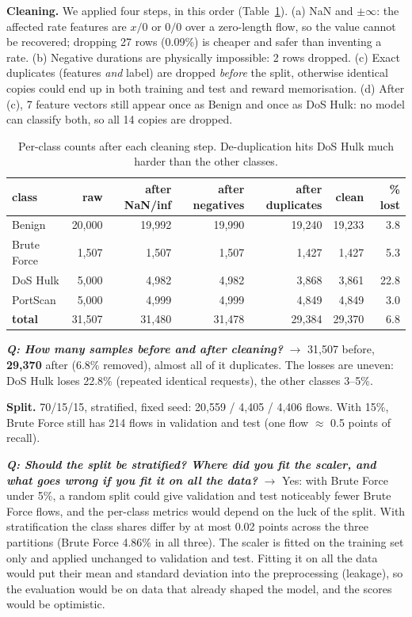 \documentclass[9pt]{extarticle}
\newcommand{\Q}[1]{\textbf{\emph{Q: #1}}}
\begin{document}
\textbf{Cleaning.} We applied four steps, in this order (Table~\ref{tab:clean}). (a) NaN and $\pm\infty$: the affected rate features are $x/0$ or $0/0$ over a zero-length flow, so the value cannot be recovered; dropping 27 rows (0.09\%) is cheaper and safer than inventing a rate. (b) Negative durations are physically impossible: 2 rows dropped. (c) Exact duplicates (features \emph{and} label) are dropped \emph{before} the split, otherwise identical copies could end up in both training and test and reward memorisation. (d) After (c), 7 feature vectors still appear once as Benign and once as DoS Hulk: no model can classify both, so all 14 copies are dropped.

\begin{table}[h]
\centering\small
\begin{tabular}{lrrrrrr}
\toprule
class & raw & after NaN/inf & after negatives & after duplicates & clean & \% lost \\
\midrule
Benign & 20,000 & 19,992 & 19,990 & 19,240 & 19,233 & 3.8 \\
Brute Force & 1,507 & 1,507 & 1,507 & 1,427 & 1,427 & 5.3 \\
DoS Hulk & 5,000 & 4,982 & 4,982 & 3,868 & 3,861 & 22.8 \\
PortScan & 5,000 & 4,999 & 4,999 & 4,849 & 4,849 & 3.0 \\
\textbf{total} & 31,507 & 31,480 & 31,478 & 29,384 & 29,370 & 6.8 \\
\bottomrule
\end{tabular}
\caption{Per-class counts after each cleaning step. De-duplication hits DoS Hulk much harder than the other classes.}
\label{tab:clean}
\end{table}

\Q{How many samples before and after cleaning?} $\rightarrow$ 31,507 before, \textbf{29,370} after (6.8\% removed), almost all of it duplicates. The losses are uneven: DoS Hulk loses 22.8\% (repeated identical requests), the other classes 3--5\%.

\textbf{Split.} 70/15/15, stratified, fixed seed: 20,559 / 4,405 / 4,406 flows. With 15\%, Brute Force still has 214 flows in validation and test (one flow $\approx$ 0.5 points of recall).

\Q{Should the split be stratified? Where did you fit the scaler, and what goes wrong if you fit it on all the data?} $\rightarrow$ Yes: with Brute Force under 5\%, a random split could give validation and test noticeably fewer Brute Force flows, and the per-class metrics would depend on the luck of the split. With stratification the class shares differ by at most 0.02 points across the three partitions (Brute Force 4.86\% in all three). The scaler is fitted on the training set only and applied unchanged to validation and test. Fitting it on all the data would put their mean and standard deviation into the preprocessing (leakage), so the evaluation would be on data that already shaped the model, and the scores would be optimistic.
\end{document}
